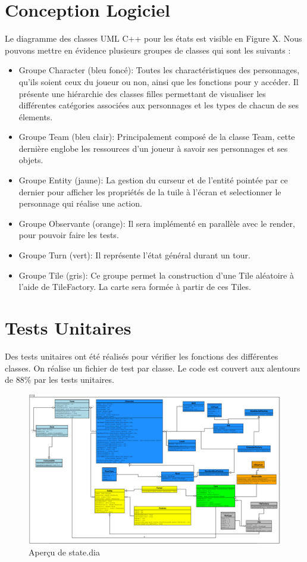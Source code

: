 \section{Conception Logiciel}
Le diagramme des classes UML C++ pour les états est visible en Figure X. Nous pouvons mettre en évidence plusieurs groupes de classes qui sont les suivants :
\\
\begin{itemize}
    \item Groupe Character (bleu foncé): Toutes les charactéristiques des personnages, qu'ils soient ceux du joueur ou non, ainsi que les fonctions pour y accéder. Il présente une hiérarchie des classes filles permettant de visualiser les différentes catégories associées aux personnages et les types de chacun de ses élements.
    \\
    \item Groupe Team (bleu clair): Principalement composé de la classe Team, cette dernière englobe les ressources d'un joueur à savoir ses personnages et ses objets.
    \\
    \item Groupe Entity (jaune): La gestion du curseur et de l'entité pointée par ce dernier pour afficher les propriétés de la tuile à l'écran et selectionner le personnage qui réalise une action. 
    \\
    \item Groupe Observante (orange): Il sera implémenté en parallèle avec le render, pour pouvoir faire les tests.
    \\
    \item Groupe Turn (vert): Il représente l'état général durant un tour.
    \\
    \item Groupe Tile (gris): Ce groupe permet la construction d'une Tile aléatoire à l'aide de TileFactory. La carte sera formée à partir de ces Tiles. 
\end{itemize}

\section{Tests Unitaires}

Des tests unitaires ont été réalisés pour vérifier les fonctions des différentes classes. On réalise un fichier de test par classe.
Le code est couvert aux alentours de 88\% par les tests unitaires.

\newpage

\begin{figure}[H]
\includegraphics[width=\linewidth]{images/states.png}
\centering
\caption{Aperçu de state.dia}
\label{fig:img3}
\end{figure}
\newpage